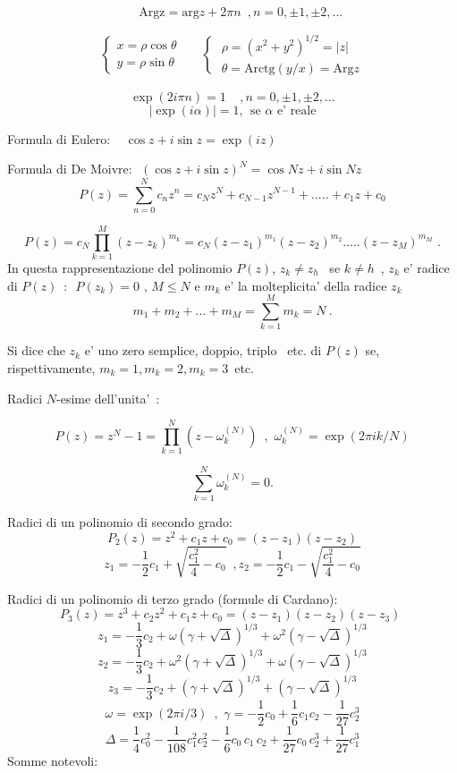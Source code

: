 \documentclass[,12pt]{article}
\begin{document}
$$~~~~~~\mbox{Argz} = \mbox{arg} z + 2 \pi n\,\,\, , n=0, \pm 1, \pm
2,...$$

$$\left\{ \begin{array}{c}
x = \rho \cos \theta  \\
y = \rho \sin \theta
\end{array} ~~~~~~\right\{ \begin{array}{c}
\rho = (x^2 +y^2)^{1/2} = \vert z \vert \\
\theta = \mbox{Arctg} (y/x) = \mbox{Arg} z \end{array}$$

$$\exp (2i \pi n) =1~~~~~, n=0, \pm 1, \pm 2,...$$
$$\vert \exp ( i \alpha) \vert =1,
\ \ \mbox{se $\alpha$ e' reale}$$

Formula di Eulero: \,\,\ $\cos z +i\sin z =\exp (iz)$

Formula di De Moivre: \,\,$(\cos z+i\sin z)^N=\cos Nz+i\sin Nz$
$$P (z) = \sum^N_{n=0} c_n z^n = c_N z^N + c_{N-1} z^{N-1} +
..... + c_1 z+ c_0$$

$$P (z) = c_N \prod^M_{k=1} (z - z_k)^{m_k} = c_N (z-z_1)^{m_1}
(z -z_2)^{m_2}.....(z-z_M)^{m_M}\,\,.$$
In questa rappresentazione del polinomio $P(z)$, $z_k \neq z_h $
\ se $k \neq h$\ ,
$z_k$ e' radice di $P(z)\,\,\, : \,\,\, P(z_k) =0$ , $M\leq N$ e
$m_k$ e' la molteplicita' della radice $z_k$
$$m_1 + m_2 + ... + m_M = \sum^M_{k=1} m_k = N\ .$$

\noindent
Si dice che $z_k$ e' uno zero semplice, doppio, triplo \ etc. di
$P(z)$ se, rispettivamente, $m_k =1, m_k =2, m_k =3$\  etc.

\noindent
Radici $N$-esime dell'unita'\ :

$$P(z) = z^N -1 = \prod^N_{k=1} (z - \omega^{(N)}_k)\,\,\, ,\,\,
\omega^{(N)}_k = \exp (2 \pi i k /N)$$

$$\sum^N_{k=1} \omega^{(N)}_k =0.$$

Radici di un polinomio di secondo grado:
$$P_2(z)=z^2+c_1z+c_0=(z-z_1)(z-z_2)$$ $$z_1=-\frac{1}{2}c_1+\sqrt{
\frac{c_1^2}{4} -c_0}\,\,\,, z_2=-\frac{1}{2}c_1-\sqrt{
\frac{c_1^2}{4} -c_0}$$

Radici di un polinomio di terzo grado (formule di Cardano):
$$P_3(z)=z^3+c_2z^2+c_1z+c_0=(z-z_1)(z-z_2)(z-z_3) \,\,$$
$$z_1=-\frac{1}{3}c_2+\omega (\gamma+\sqrt\Delta)^{1/3}+\omega^2
(\gamma-\sqrt\Delta)^{1/3} $$
$$z_2=-\frac{1}{3}c_2+\omega^2 (\gamma+\sqrt\Delta)^{1/3}+\omega
(\gamma-\sqrt\Delta)^{1/3}$$
$$z_3=-\frac{1}{3}c_2+(\gamma+\sqrt\Delta)^{1/3}+
(\gamma-\sqrt\Delta)^{1/3}$$
$$\omega=\exp(2\pi i/3)\,\,\,,\,\,\gamma
=-\frac{1}{2}c_0+\frac{1}{6}c_1c_2-\frac{1}{27}c_2^3$$
$$\Delta=\frac{1}{4}c_0^2-\frac{1}{108}c_1^2c_2^2-\frac{1}{6}
c_0\,c_1\,c_2+\frac{1}{27}c_0\,c_2^3+\frac{1}{27}c_1^3$$
Somme notevoli:
\end{document}
